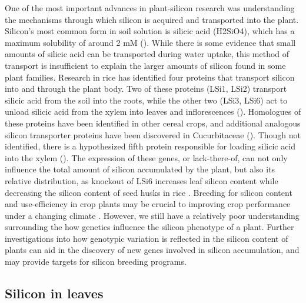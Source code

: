 \documentclass[12pt, letterpaper, ]{article}
\begin{document}
One of the most important advances in plant-silicon research was understanding the mechanisms through which silicon is acquired and transported into the plant. Silicon’s most common form in soil solution is silicic acid (H2SiO4), which has a maximum solubility of around 2 mM (\cite{haynes_contemporary_2014}). While there is some evidence that small amounts of silicic acid can be transported during water uptake, this method of transport is insufficient to explain the larger amounts of silicon found in some plant families. Research in rice has identified four proteins that transport silicon into and through the plant body. Two of these proteins (LSi1, LSi2) transport silicic acid from the soil into the roots, while the other two (LSi3, LSi6) act to unload silicic acid from the xylem into leaves and inflorescences (\cite{yamaji_orchestration_2015}). Homologues of these proteins have been identified in other cereal crops, and additional analogous silicon transporter proteins have been discovered in Cucurbitaceae (\cite{reynolds_silicon_2016}). Though not identified, there is a hypothesized fifth protein responsible for loading silicic acid into the xylem (\cite{farooq_silicon_2015}). The expression of these genes, or lack-there-of, can not only influence the total amount of silicon accumulated by the plant, but also its relative distribution, as knockout of LSi6 increases leaf silicon content while decreasing the silicon content of seed husks in rice \cite{yamaji_transporter_2008}. Breeding for silicon content and use-efficiency in crop plants may be crucial to improving crop performance under a changing climate \cite{christian_breeding_2022}. However, we still have a relatively poor understanding surrounding the how genetics influence the silicon phenotype of a plant. Further investigations into how genotypic variation is reflected in the silicon content of plants can aid in the discovery of new genes involved in silicon accumulation, and may provide targets for silicon breeding programs. 

\subsection{Silicon in leaves}	
\end{document}
